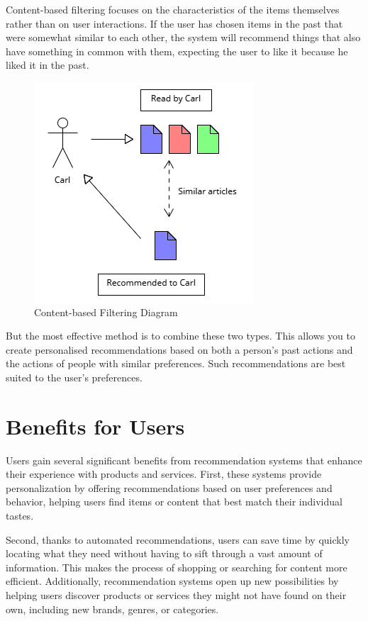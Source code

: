 \documentclass[10pt,twoside,slovak,a4paper]{article}
\begin{document}
\begin{enumerate}
Content-based filtering focuses on the characteristics of the items themselves rather than on user interactions. If the user has chosen items in the past that were somewhat similar to each other, the system will recommend things that also have something in common with them, expecting the user to like it because he liked it in the past.
\begin{figure}[!h]
    \centering
    \includegraphics[width=0.7\linewidth]{Diagram 4.png}
    \caption{Content-based Filtering Diagram}
    \label{fig:picture}
\end{figure}
	
\end{enumerate}

But the most effective method is to combine these two types. This allows you to create personalised recommendations based on both a person's past actions and the actions of people with similar preferences. Such recommendations are best suited to the user's preferences.

\newpage
\section{Benefits for Users} \label{Benefits for Users}
Users gain several significant benefits from recommendation systems that enhance their experience with products and services. First, these systems provide personalization by offering recommendations based on user preferences and behavior, helping users find items or content that best match their individual tastes.

Second, thanks to automated recommendations, users can save time by quickly locating what they need without having to sift through a vast amount of information. This makes the process of shopping or searching for content more efficient. Additionally, recommendation systems open up new possibilities by helping users discover products or services they might not have found on their own, including new brands, genres, or categories.
\end{document}
